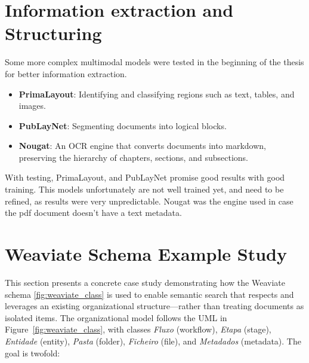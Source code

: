 \label{chapter:Results}

\section{Information extraction and Structuring}
Some more complex multimodal models were tested in the beginning of the thesis for better information extraction.
\begin{itemize}
    \item \textbf{PrimaLayout}: Identifying and classifying regions such as text, tables, and images.
    \item \textbf{PubLayNet}: Segmenting documents into logical blocks.
    \item \textbf{Nougat}: An OCR engine that converts documents into markdown, preserving the hierarchy of chapters, sections, and subsections.
\end{itemize}
With testing, PrimaLayout, and PubLayNet promise good results with good training. This models unfortunately are not well trained yet, and need to be refined, as results were very unpredictable. Nougat was the engine used in case the pdf document doesn't have a text metadata.
\section{Weaviate Schema Example Study}
\label{sec:schema_example_study}

This section presents a concrete case study demonstrating how the Weaviate schema \ref{fig:weaviate_class} is used to enable semantic search that respects and leverages an existing organizational structure—rather than treating documents as isolated items. The organizational model follows the UML in Figure~\ref{fig:weaviate_class}, with classes \textit{Fluxo} (workflow), \textit{Etapa} (stage), \textit{Entidade} (entity), \textit{Pasta} (folder), \textit{Ficheiro} (file), and \textit{Metadados} (metadata). The goal is twofold:

